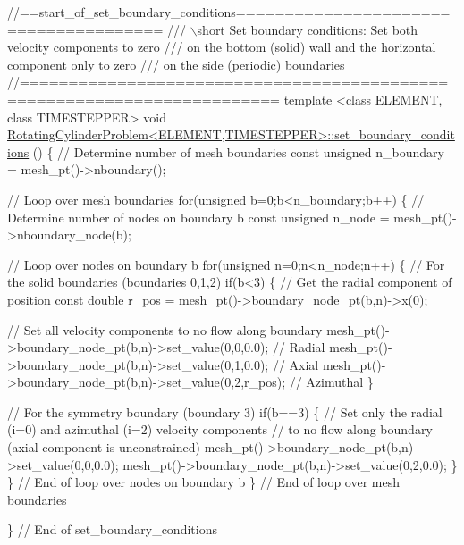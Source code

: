 \begin{DoxyCodeInclude}
\textcolor{comment}{//==start\_of\_set\_boundary\_conditions======================================}
\textcolor{comment}{/// \(\backslash\)short Set boundary conditions: Set both velocity components to zero}
\textcolor{comment}{}\textcolor{comment}{/// on the bottom (solid) wall and the horizontal component only to zero}
\textcolor{comment}{}\textcolor{comment}{/// on the side (periodic) boundaries}
\textcolor{comment}{}\textcolor{comment}{//========================================================================}
\textcolor{keyword}{template} <\textcolor{keyword}{class} ELEMENT, \textcolor{keyword}{class} TIMESTEPPER>
\textcolor{keywordtype}{void} \hyperlink{classRotatingCylinderProblem_a37efdb2d7059535a48b12f69869996ee}{RotatingCylinderProblem<ELEMENT,TIMESTEPPER>::set\_boundary\_conditions}
      ()
\{
 \textcolor{comment}{// Determine number of mesh boundaries}
 \textcolor{keyword}{const} \textcolor{keywordtype}{unsigned} n\_boundary = mesh\_pt()->nboundary();
 
 \textcolor{comment}{// Loop over mesh boundaries}
 \textcolor{keywordflow}{for}(\textcolor{keywordtype}{unsigned} b=0;b<n\_boundary;b++)
  \{
   \textcolor{comment}{// Determine number of nodes on boundary b}
   \textcolor{keyword}{const} \textcolor{keywordtype}{unsigned} n\_node = mesh\_pt()->nboundary\_node(b);
   
   \textcolor{comment}{// Loop over nodes on boundary b}
   \textcolor{keywordflow}{for}(\textcolor{keywordtype}{unsigned} n=0;n<n\_node;n++)
    \{
     \textcolor{comment}{// For the solid boundaries (boundaries 0,1,2)}
     \textcolor{keywordflow}{if}(b<3)
      \{
       \textcolor{comment}{// Get the radial component of position}
       \textcolor{keyword}{const} \textcolor{keywordtype}{double} r\_pos = mesh\_pt()->boundary\_node\_pt(b,n)->x(0);
           
       \textcolor{comment}{// Set all velocity components to no flow along boundary}
       mesh\_pt()->boundary\_node\_pt(b,n)->set\_value(0,0,0.0); \textcolor{comment}{// Radial}
       mesh\_pt()->boundary\_node\_pt(b,n)->set\_value(0,1,0.0); \textcolor{comment}{// Axial}
       mesh\_pt()->boundary\_node\_pt(b,n)->set\_value(0,2,r\_pos); \textcolor{comment}{// Azimuthal}
      \}

     \textcolor{comment}{// For the symmetry boundary (boundary 3)}
     \textcolor{keywordflow}{if}(b==3)
      \{
       \textcolor{comment}{// Set only the radial (i=0) and azimuthal (i=2) velocity components}
       \textcolor{comment}{// to no flow along boundary (axial component is unconstrained)}
       mesh\_pt()->boundary\_node\_pt(b,n)->set\_value(0,0,0.0);
       mesh\_pt()->boundary\_node\_pt(b,n)->set\_value(0,2,0.0);
      \}
    \} \textcolor{comment}{// End of loop over nodes on boundary b}
  \} \textcolor{comment}{// End of loop over mesh boundaries}
 
\} \textcolor{comment}{// End of set\_boundary\_conditions}

\end{DoxyCodeInclude}





